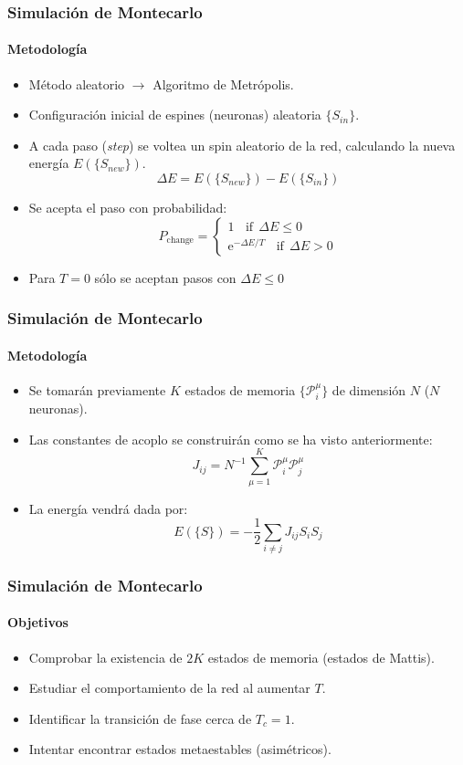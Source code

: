 \documentclass[11pt]{beamer}
\begin{document}
\begin{frame}
\frametitle{Simulación de Montecarlo}
\framesubtitle{Metodología}

\begin{itemize}
    \item Método aleatorio $\longrightarrow$ Algoritmo de Metrópolis.
    \item Configuración inicial de espines (neuronas) aleatoria $\{ S_{in} \}$.
    \item A cada paso (\textit{step}) se voltea un spin aleatorio de la red, calculando la nueva energía $E(\{S_{new}\})$.
    $$
    \Delta E = E(\{S_{new}\}) - E(\{S_{in}\})
    $$
    \item Se acepta el paso con probabilidad:
    $$
    P_{\text{change}} = \left\{
\begin{aligned}
    1 \ \ \ \ \text{if} \ \ \Delta E \leq 0 \\
    \text{e}^{-\Delta E/T} \ \ \ \ \text{if} \ \ \Delta E > 0
\end{aligned}
\right.
    $$
    \item Para $T = 0$ sólo se aceptan pasos con $\Delta E \leq 0$
\end{itemize}
    
\end{frame}

\begin{frame}
\frametitle{Simulación de Montecarlo}
\framesubtitle{Metodología}
\begin{itemize}
\item Se tomarán previamente $K$ estados de memoria $\{ \mathcal{P}^{\mu}_{i} \}$ de dimensión $N$ ($N$ neuronas).
\item Las constantes de acoplo se construirán como se ha visto anteriormente:
$$
J_{ij} = N^{-1} \sum_{\mu = 1}^{K} \mathcal{P}^{\mu}_{i} \mathcal{P}^{\mu}_{j}
$$
\item La energía vendrá dada por:
$$
E(\{S\}) = - \frac{1}{2} \sum_{i \neq j} J_{ij} S_{i} S_{j}
$$
\end{itemize}   
\end{frame}

\begin{frame}
\frametitle{Simulación de Montecarlo}
\framesubtitle{Objetivos}
\begin{itemize}
\item Comprobar la existencia de $2K$ estados de memoria (estados de Mattis).
\item Estudiar el comportamiento de la red al aumentar $T$.
\item Identificar la transición de fase cerca de $T_{c} = 1$.
\item Intentar encontrar estados metaestables (asimétricos).
\end{itemize}   
\end{frame}
\end{document}
